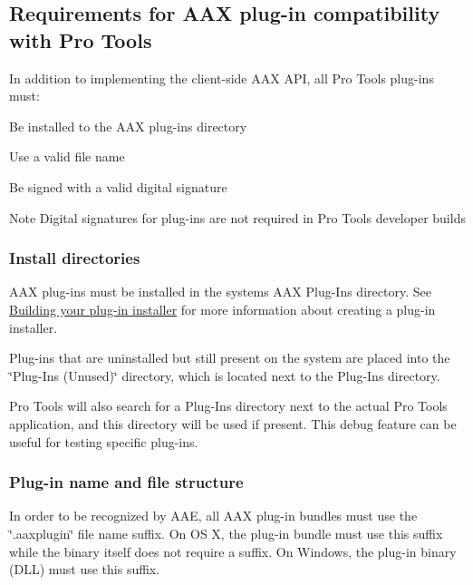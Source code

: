  \hypertarget{a00360_aax_pro_tools_guide_02_requirements_for_aax_plugin_compatibility_with_pro_tools}{}\subsection{Requirements for A\+A\+X plug-\/in compatibility with Pro Tools}\label{a00360_aax_pro_tools_guide_02_requirements_for_aax_plugin_compatibility_with_pro_tools}
 In addition to implementing the client-\/side A\+A\+X A\+P\+I, all Pro Tools plug-\/ins must\+: 
\begin{DoxyEnumerate}
\item Be installed to the A\+A\+X plug-\/ins directory  
\item Use a valid file name 
\item Be signed with a valid digital signature \begin{DoxyNote}{Note}
Digital signatures for plug-\/ins are not required in Pro Tools developer builds  
\end{DoxyNote}

\end{DoxyEnumerate}

\hypertarget{a00360_subsection__install_directories_}{}\subsubsection{Install directories}\label{a00360_subsection__install_directories_}
 A\+A\+X plug-\/ins must be installed in the system\textquotesingle{}s A\+A\+X Plug-\/\+Ins directory. See \hyperlink{a00372_aax_distributing_installer}{Building your plug-\/in installer} for more information about creating a plug-\/in installer.

Plug-\/ins that are uninstalled but still present on the system are placed into the \char`\"{}\+Plug-\/\+Ins (\+Unused)\char`\"{} directory, which is located next to the Plug-\/\+Ins directory.

Pro Tools will also search for a Plug-\/\+Ins directory next to the actual Pro Tools application, and this directory will be used if present. This debug feature can be useful for testing specific plug-\/ins.

\hypertarget{a00360_subsection__file_name_}{}\subsubsection{Plug-\/in name and file structure}\label{a00360_subsection__file_name_}
 In order to be recognized by A\+A\+E, all A\+A\+X plug-\/in bundles must use the \char`\"{}.\+aaxplugin\char`\"{} file name suffix. On O\+S X, the plug-\/in bundle must use this suffix while the binary itself does not require a suffix. On Windows, the plug-\/in binary (D\+L\+L) must use this suffix.

